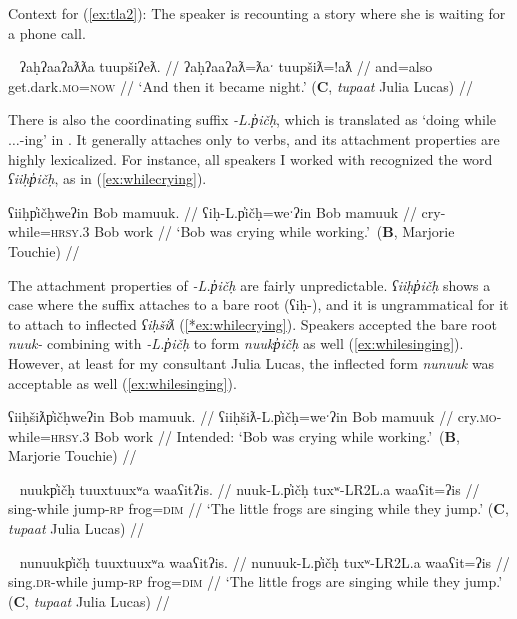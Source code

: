 \noindent Context for (\ref{ex:tla2}): The speaker is recounting a story where she is waiting for a phone call.

\ex~ \label{ex:tla2}
\begingl
\glpreamble ʔaḥʔaaʔaƛƛa tuupšiʔeƛ. //
\gla ʔaḥʔaaʔaƛ=ƛaˑ tuupšiƛ=!aƛ //
\glb and=also get.dark.\textsc{mo}=\textsc{now}  //
\glft `And then it became night.' (\textbf{C}, \textit{tupaat} Julia Lucas) //
\endgl
\xe

There is also the coordinating suffix \textit{-L.p̓ičḥ}, which is translated as `doing while $\ldots$-ing' in \citet{sapir1939}. It generally attaches only to verbs, and its attachment properties are highly lexicalized. For instance, all speakers I worked with recognized the word \textit{ʕiiḥp̓ičḥ}, as in (\ref{ex:whilecrying}).

\ex \label{ex:whilecrying}
\begingl
\glpreamble ʕiiḥp̓ičḥweʔin Bob mamuuk. //
\gla ʕiḥ-L.p̓ičḥ=weˑʔin Bob mamuuk //
\glb cry-while=\textsc{hrsy.3} Bob work //
\glft `Bob was crying while working.'\footnotemark{}\ (\textbf{B}, Marjorie Touchie) //
\endgl
\xe


The attachment properties of \textit{-L.p̓ičḥ} are fairly unpredictable. \textit{ʕiiḥp̓ičḥ} shows a case where the suffix attaches to a bare root (ʕiḥ-), and it is ungrammatical for it to attach to inflected \textit{ʕiḥšiƛ} (\ref{*ex:whilecrying}). Speakers accepted the bare root \textit{nuuk-} combining with \textit{-L.p̓ičḥ} to form \textit{nuukp̓ičḥ} as well (\ref{ex:whilesinging}). However, at least for my consultant Julia Lucas, the inflected form \textit{nunuuk} was acceptable as well (\ref{ex:whilesinging}).

\ex \label{*ex:whilecrying}
\begingl
\glpreamble *ʕiiḥšiƛp̓ičḥweʔin Bob mamuuk. //
\gla ʕiiḥšiƛ-L.p̓ičḥ=weˑʔin Bob mamuuk //
\glb cry.\textsc{mo}-while=\textsc{hrsy.3} Bob work //
\glft Intended: `Bob was crying while working.'\footnotemark{}\ (\textbf{B}, Marjorie Touchie) //
\endgl
\xe

\ex~ \label{ex:whilesinging}
\begingl
\glpreamble nuukp̓ičḥ tuuxtuuxʷa waaʕitʔis. //
\gla nuuk-L.p̓ičḥ tuxʷ-LR2L.a waaʕit=ʔis //
\glb sing-while jump-\textsc{rp} frog=\textsc{dim} //
\glft `The little frogs are singing while they jump.' (\textbf{C}, \textit{tupaat} Julia Lucas) //
\endgl
\xe

\ex~ \label{ex:whilesinging2}
\begingl
\glpreamble nunuukp̓ičḥ tuuxtuuxʷa waaʕitʔis. //
\gla nunuuk-L.p̓ičḥ tuxʷ-LR2L.a waaʕit=ʔis //
\glb sing.\textsc{dr}-while jump-\textsc{rp} frog=\textsc{dim} //
\glft `The little frogs are singing while they jump.' (\textbf{C}, \textit{tupaat} Julia Lucas) //
\endgl
\xe


